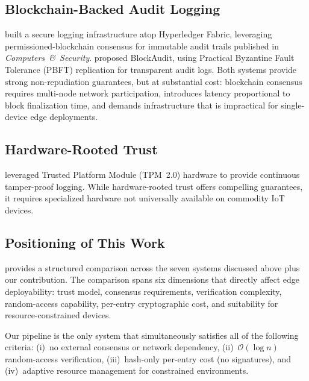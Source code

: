 \documentclass[preprint,12pt]{elsarticle}
\begin{document}
\subsection{Blockchain-Backed Audit Logging}

\citet{putz2019secure} built a secure logging infrastructure atop Hyperledger Fabric, leveraging permissioned-blockchain consensus for immutable audit trails published in \textit{Computers~\&~Security}.
\citet{ahmad2019blockaudit} proposed BlockAudit, using Practical Byzantine Fault Tolerance (PBFT) replication for transparent audit logs.
Both systems provide strong non-repudiation guarantees, but at substantial cost: blockchain consensus requires multi-node network participation, introduces latency proportional to block finalization time, and demands infrastructure that is impractical for single-device edge deployments.

\subsection{Hardware-Rooted Trust}

\citet{sinha2014continuous} leveraged Trusted Platform Module (TPM~2.0) hardware to provide continuous tamper-proof logging.
While hardware-rooted trust offers compelling guarantees, it requires specialized hardware not universally available on commodity IoT devices.

\subsection{Positioning of This Work}

 provides a structured comparison across the seven systems discussed above plus our contribution.
The comparison spans six dimensions that directly affect edge deployability: trust model, consensus requirements, verification complexity, random-access capability, per-entry cryptographic cost, and suitability for resource-constrained devices.

Our pipeline is the only system that simultaneously satisfies all of the following criteria: (i)~no external consensus or network dependency, (ii)~$\mathcal{O}(\log n)$ random-access verification, (iii)~hash-only per-entry cost (no signatures), and (iv)~adaptive resource management for constrained environments.
\end{document}
